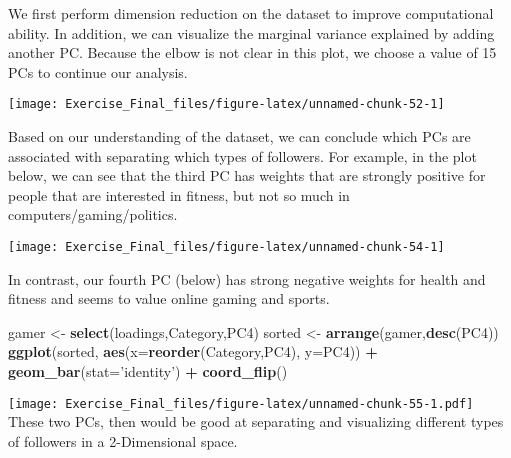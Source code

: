 \documentclass[
]{article}
\newenvironment{Shaded}{\begin{snugshade}}{\end{snugshade}}
\newcommand{\DataTypeTok}[1]{\textcolor[rgb]{0.13,0.29,0.53}{#1}}
\newcommand{\DecValTok}[1]{\textcolor[rgb]{0.00,0.00,0.81}{#1}}
\newcommand{\KeywordTok}[1]{\textcolor[rgb]{0.13,0.29,0.53}{\textbf{#1}}}
\newcommand{\NormalTok}[1]{#1}
\newcommand{\OperatorTok}[1]{\textcolor[rgb]{0.81,0.36,0.00}{\textbf{#1}}}
\newcommand{\StringTok}[1]{\textcolor[rgb]{0.31,0.60,0.02}{#1}}
\begin{document}
We first perform dimension reduction on the dataset to improve
computational ability. In addition, we can visualize the marginal
variance explained by adding another PC. Because the elbow is not clear
in this plot, we choose a value of 15 PCs to continue our analysis.

\begin{center}\texttt{[image: Exercise\_Final\_files/figure-latex/unnamed-chunk-52-1]} \end{center}

Based on our understanding of the dataset, we can conclude which PCs are
associated with separating which types of followers. For example, in the
plot below, we can see that the third PC has weights that are strongly
positive for people that are interested in fitness, but not so much in
computers/gaming/politics.

\begin{center}\texttt{[image: Exercise\_Final\_files/figure-latex/unnamed-chunk-54-1]} \end{center}

In contrast, our fourth PC (below) has strong negative weights for
health and fitness and seems to value online gaming and sports.

\begin{Shaded}
\begin{Highlighting}[]
\NormalTok{gamer <-}\StringTok{ }\KeywordTok{select}\NormalTok{(loadings,Category,PC4)}
\NormalTok{sorted <-}\StringTok{ }\KeywordTok{arrange}\NormalTok{(gamer,}\KeywordTok{desc}\NormalTok{(PC4))}
\KeywordTok{ggplot}\NormalTok{(sorted, }\KeywordTok{aes}\NormalTok{(}\DataTypeTok{x=}\KeywordTok{reorder}\NormalTok{(Category,PC4), }\DataTypeTok{y=}\NormalTok{PC4)) }\OperatorTok{+}
\StringTok{  }\KeywordTok{geom_bar}\NormalTok{(}\DataTypeTok{stat=}\StringTok{'identity'}\NormalTok{) }\OperatorTok{+}\StringTok{ }\KeywordTok{coord_flip}\NormalTok{()}
\end{Highlighting}
\end{Shaded}

\texttt{[image: Exercise\_Final\_files/figure-latex/unnamed-chunk-55-1.pdf]}
These two PCs, then would be good at separating and visualizing
different types of followers in a 2-Dimensional space.

\begin{Shaded}
\end{Shaded}
\end{document}
